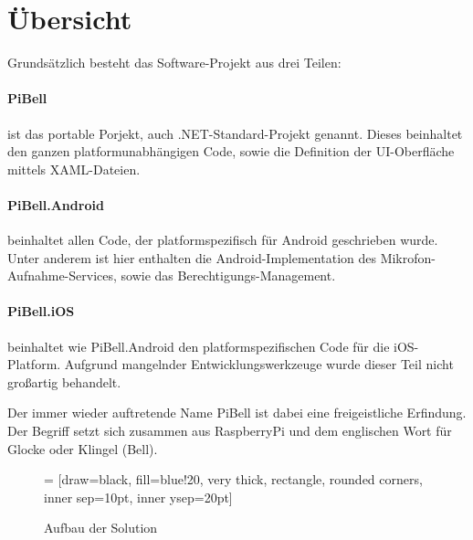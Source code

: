 

\section{Übersicht}
Grundsätzlich besteht das Software-Projekt aus drei Teilen:
\paragraph{PiBell} ist das portable Porjekt, auch .NET-Standard-Projekt genannt.
Dieses beinhaltet den ganzen platformunabhängigen Code, sowie die Definition der UI-Oberfläche mittels XAML-Dateien.\par
\paragraph{PiBell.Android} beinhaltet allen Code, der platformspezifisch für Android geschrieben wurde. Unter anderem ist hier enthalten die Android-Implementation des Mikrofon-Auf\-nahme-Services, sowie das Berechtigungs-Management.\par
\paragraph{PiBell.iOS} beinhaltet wie PiBell.Android den platformspezifischen Code für die iOS-Plat\-form. Aufgrund mangelnder Entwicklungswerkzeuge wurde dieser Teil nicht großartig behandelt.\par
Der immer wieder auftretende Name PiBell ist dabei eine freigeistliche Erfindung. Der Begriff setzt sich zusammen aus RaspberryPi und dem englischen Wort für Glocke oder Klingel (Bell).\par
\begin{figure}
 = [draw=black, fill=blue!20, very thick,
    rectangle, rounded corners, inner sep=10pt, inner ysep=20pt]
\begin{tikzpicture}
\end{tikzpicture}
\caption{Aufbau der Solution}
\end{figure}

